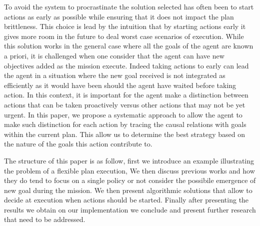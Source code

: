 To avoid the system to procrastinate the solution selected has often 
been to start actions as early as possible while ensuring that it does 
not impact the plan brittleness. This choice is lead by the intuition that by
starting actions early it gives more room in the future to deal worst
case scenarios of execution. While this solution works in the general 
case where all the goals of the agent are known a priori, it is
challenged when one consider that the agent can have new objectives
added as the mission execute. Indeed taking actions to early can lead
the agent in a situation where the new goal received is not integrated
as efficiently as it would have been should the agent have waited
before taking action. In this context, it is important for the agent
make a distinction between actions that can be taken proactively
versus other actions that may not be yet urgent.  In this paper, we
propose a systematic approach to allow the agent to make such
distinction for each action by tracing the causal relations with
 goals within the current plan.  This allow us to determine the best
 strategy based on the nature of the goals this action contribute to.

 The structure of this paper is as follow, first we introduce an
example illustrating the problem of a flexible plan execution, We then
discuss previous works and how they do tend to focus on a single
policy or not consider the possibile emergence of new goal during the
mission. We then present algorithmic solutions that allow to decide at
execution when actions should be started. Finally after presenting the
results we obtain on our implementation we conclude and present further
research that need to be addressed. 




